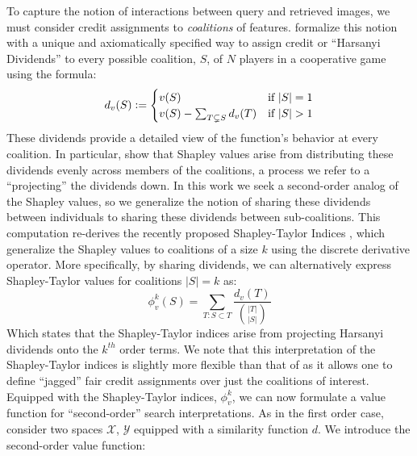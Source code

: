 \documentclass{article} %
\newcommand{\defeq}{\vcentcolon=}
\begin{document}
 To capture the notion of interactions between query and retrieved images, we must consider credit assignments to \textit{coalitions} of features. \citep{harsanyi1963simplified} formalize this notion with a unique and axiomatically specified way to assign credit or ``Harsanyi Dividends'' to every possible coalition, $S$, of $N$ players in a cooperative game using the formula:
\begin{equation}
      d_v(S) \defeq
  \begin{cases}
    v(S) & \text{if $|S|=1$} \\
    v(S) - \sum_{T \subsetneq S} d_v(T) & \text{if $|S|>1$} \\
    \end{cases}
\end{equation}
These dividends provide a detailed view of the function's behavior at every coalition. In particular, \cite{harsanyi1963simplified} show that Shapley values arise from distributing these dividends evenly across members of the coalitions, a process we refer to a ``projecting'' the dividends down. In this work we seek a second-order analog of the Shapley values, so we generalize the notion of sharing these dividends between individuals to sharing these dividends between sub-coalitions. This computation re-derives the recently proposed Shapley-Taylor Indices \citep{sundararajan2020shapley}, which generalize the Shapley values to coalitions of a size $k$ using the discrete derivative operator. More specifically, by sharing dividends, we can alternatively express Shapley-Taylor values for coalitions $|S| = k$ as:
\vspace{-.05in}
 \begin{equation}
    \phi^k_v(S) = \sum_{T:S \subset T} \frac{d_v(T)}{\binom{|T|}{|S|}}
 \end{equation}
Which states that the Shapley-Taylor indices arise from projecting Harsanyi dividends onto the $k^{th}$ order terms. We note that this interpretation of the Shapley-Taylor indices is slightly more flexible than that of \cite{sundararajan2020shapley} as it allows one to define ``jagged'' fair credit assignments over just the coalitions of interest. %
 Equipped with the Shapley-Taylor indices, $\phi^k_v$, we can now formulate a value function for ``second-order'' search interpretations. As in the first order case, consider two spaces $\mathcal{X}$, $\mathcal{Y}$ equipped with a similarity function $d$. We introduce the second-order value function:
\end{document}

